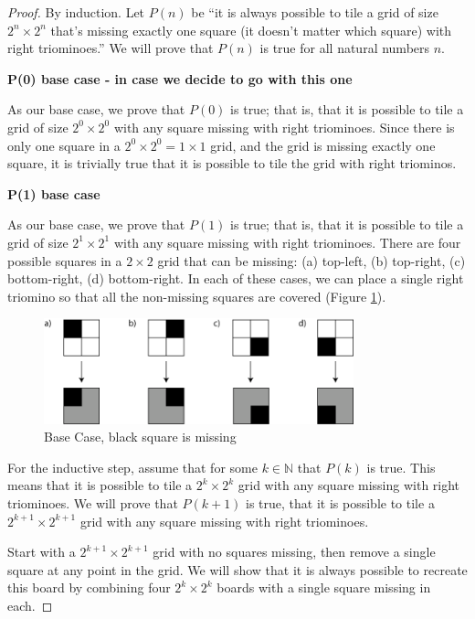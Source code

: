 \documentclass[10pt,letter]{article}
\begin{document}
\begin{proof}
By induction. Let $P(n)$ be ``it is always possible to tile a grid of size $2^n \times 2^n$ that's missing exactly one square (it doesn't matter which square) with right triominoes.'' We will prove that $P(n)$ is true for all natural numbers $n$. 

\textbf{P(0) base case - in case we decide to go with this one}

As our base case, we prove that $P(0)$ is true; that is, that it is possible to tile a grid of size $2^0 \times 2^0$ with any square missing with right triominoes. Since there is only one square in a $2^0 \times 2^0 = 1 \times 1$ grid, and the grid is missing exactly one square, it is trivially true that it is possible to tile the grid with right triominos.

\textbf{P(1) base case}

As our base case, we prove that $P(1)$ is true; that is, that it is possible to tile a grid of size $2^1 \times 2^1$ with any square missing with right triominoes. There are four possible squares in a $2 \times 2$ grid that can be missing: (a) top-left, (b) top-right, (c) bottom-right, (d) bottom-right. In each of these cases, we can place a single right triomino so that all the non-missing squares are covered (Figure \ref{fig:tile_base}).

\begin{figure}[h]
    \centering
    \includegraphics[width=0.8\textwidth]{rightTriominoes.png}
    \caption{Base Case, black square is missing}
    \label{fig:tile_base}
\end{figure}

For the inductive step, assume that for some $k \in \mathbb{N}$ that $P(k)$ is true. This means that it is possible to tile a $2^k \times 2^k$ grid with any square missing with right triominoes. We will prove that $P(k+1)$ is true, that it is possible to tile a $2^{k+1} \times 2^{k+1}$ grid with any square missing with right triominoes. 

Start with a $2^{k+1} \times 2^{k+1}$ grid with no squares missing, then remove a single square at any point in the grid. We will show that it is always possible to recreate this board by combining four $2^k \times 2^k$ boards with a single square missing in each. 


\end{proof}
\end{document}
